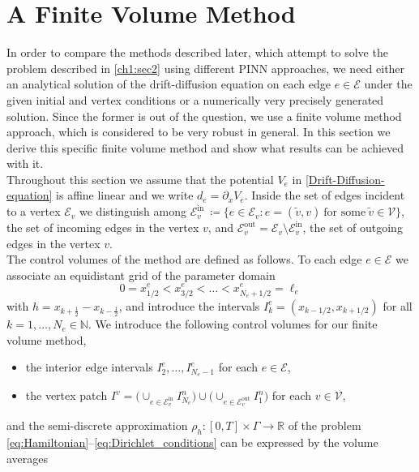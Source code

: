 \chapter{A Finite Volume Method}
\label{ch2}

In order to compare the methods described later, which attempt to solve the problem described in \cref{ch1:sec2} using different PINN approaches, we need either an analytical solution of the drift-diffusion equation on each edge $e \in \mathcal{E}$ under the given initial and vertex conditions or a numerically very precisely generated solution. Since the former is out of the question, we use a finite volume method approach, which is considered to be very robust in general. In this section we derive this specific finite volume method and show what results can be achieved with it.  \\
Throughout this section we assume that the potential $V_e$ in \cref{Drift-Diffusion-equation} is affine linear and we write $d_e = \partial_x V_e$. Inside the set of edges incident to a vertex $\mathcal{E}_v$ we distinguish among $\mathcal{E}_v^{\text{in}} \ \coloneqq \{ e \in \mathcal{E}_v \colon e = ( \widetilde{v}, v ) \ \text{for some} \ \widetilde{v} \in \mathcal{V} \}$, the set of incoming edges in the vertex $v$, and $\mathcal{E}_v^{\text{out}} = \mathcal{E}_v \setminus \mathcal{E}_v^{\text{in}}$, the set of outgoing edges in the vertex $v$. \\
The control volumes of the method are defined as follows. To each edge $e \in \mathcal{E}$ we associate an equidistant grid of the parameter domain
\begin{equation*}
	0 = x^e_{1/2} < x^e_{3/2} <\ldots < x^e_{N_e+1/2} = \ell_e
\end{equation*}
with $h = x_{k+\frac{1}{2}} - x_{k-\frac{1}{2}}$, and introduce the intervals $I_k^e = (x_{k-1/2}, x_{k+1/2})$ for all $k=1, \ldots, N_e \in \mathbb{N}$. We introduce the following control volumes for our finite volume method,
\begin{itemize}
	\item the interior edge intervals $I_2^e, \ldots, I_{N_e-1}^e$ for
	each $e \in \mathcal{E}$,
	\item the vertex patch $I^v = \big(\cup_{e\in \mathcal{E}_v^{\text{in}}} I_{N_e}^n\big) \cup \big(\cup_{e\in \mathcal{E}_v^{\text{out}}} I_1^n\big)$ for
	each $v \in \mathcal{V}$,
\end{itemize}
and the semi-discrete approximation $\rho_h \colon [0,T] \times \Gamma \to \mathbb{R}$ of the problem \eqref{eq:Hamiltonian}--\eqref{eq:Dirichlet_conditions} can be expressed by the volume averages 
